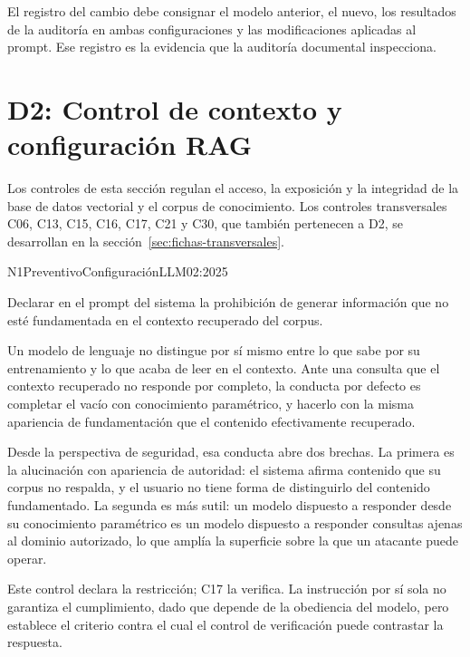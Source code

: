 El registro del cambio debe consignar el modelo anterior, el nuevo, los resultados de la auditoría en ambas configuraciones y las modificaciones aplicadas al prompt. Ese registro es la evidencia que la auditoría documental inspecciona.


\section{D2: Control de contexto y configuración RAG}
\label{sec:fichas-d2}

Los controles de esta sección regulan el acceso, la exposición y la integridad de la base de datos vectorial y el corpus de conocimiento. Los controles transversales C06, C13, C15, C16, C17, C21 y C30, que también pertenecen a D2, se desarrollan en la sección~\ref{sec:fichas-transversales}.

  {N1}{Preventivo}{Configuración}{LLM02:2025}

Declarar en el prompt del sistema la prohibición de generar información que no esté fundamentada en el contexto recuperado del corpus.

Un modelo de lenguaje no distingue por sí mismo entre lo que sabe por su entrenamiento y lo que acaba de leer en el contexto. Ante una consulta que el contexto recuperado no responde por completo, la conducta por defecto es completar el vacío con conocimiento paramétrico, y hacerlo con la misma apariencia de fundamentación que el contenido efectivamente recuperado.

Desde la perspectiva de seguridad, esa conducta abre dos brechas. La primera es la alucinación con apariencia de autoridad: el sistema afirma contenido que su corpus no respalda, y el usuario no tiene forma de distinguirlo del contenido fundamentado. La segunda es más sutil: un modelo dispuesto a responder desde su conocimiento paramétrico es un modelo dispuesto a responder consultas ajenas al dominio autorizado, lo que amplía la superficie sobre la que un atacante puede operar.

Este control declara la restricción; C17 la verifica. La instrucción por sí sola no garantiza el cumplimiento, dado que depende de la obediencia del modelo, pero establece el criterio contra el cual el control de verificación puede contrastar la respuesta.

